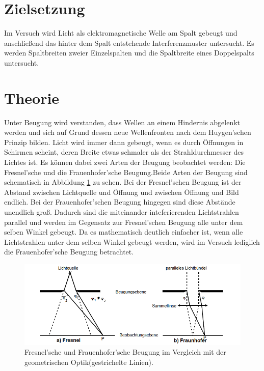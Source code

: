 \section{Zielsetzung}
Im Versuch wird Licht als elektromagnetische Welle am Spalt gebeugt und anschließend das
hinter dem Spalt entstehende Interferenzmuster untersucht. Es werden Spaltbreiten
zweier Einzelspalten und die Spaltbreite eines Doppelspalts untersucht.

\section{Theorie}
Unter Beugung wird verstanden, dass Wellen an einem Hindernis abgelenkt werden und
sich auf Grund dessen neue Wellenfronten nach dem Huygen'schen Prinzip bilden.
Licht wird immer dann gebeugt, wenn es durch Öffnungen in Schirmen scheint, deren Breite
etwas schmaler als der Strahldurchmesser des Lichtes ist.
Es können dabei zwei Arten der Beugung beobachtet werden: Die Fresnel'sche und die
Frauenhofer'sche Beugung.Beide Arten der Beugung sind schematisch in Abbildung \ref{abb1}
zu sehen. Bei der Fresnel'schen Beugung ist der Abstand zwischen Lichtquelle und Öffnung
und zwischen Öffnung und Bild endlich. Bei der Frauenhofer'schen Beugung hingegen sind diese
Abstände unendlich groß. Dadurch sind die miteinander inteferierenden Lichtstrahlen parallel
und werden im Gegensatz zur Fresnel'schen Beugung alle unter dem selben Winkel gebeugt.
Da es mathematisch deutlich einfacher ist, wenn alle Lichtstrahlen unter dem selben Winkel
gebeugt werden, wird im Versuch lediglich die Frauenhofer'sche Beugung betrachtet.
\FloatBarrier

\begin{figure}
  \centering
  \includegraphics[scale=0.5]{Strahlen.PNG}
  \caption{Fresnel'sche und Frauenhofer'sche Beugung im Vergleich mit der geometrischen
  Optik(gestrichelte Linien). \cite{Q1}}
  \label{abb1}
\end{figure}

